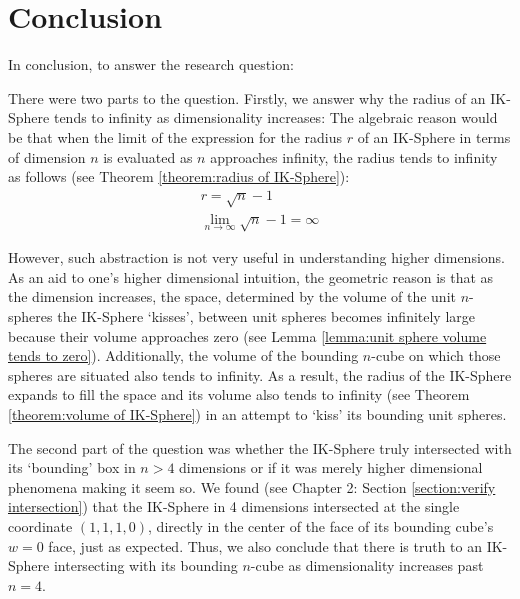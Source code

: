 \section{Conclusion}
In conclusion, to answer the research question:
\researchquestion{}

There were two parts to the question. Firstly, we answer why the radius of an IK-Sphere tends to infinity as dimensionality increases:
The algebraic reason would be that when the limit of the expression for the radius $r$ of an IK-Sphere in terms of dimension $n$ is evaluated as $n$ approaches infinity, the radius tends to infinity as follows (see Theorem \ref{theorem:radius of IK-Sphere}):
\begin{align*}
    r = \sqrt{n}-1\\
    \lim_{n \to \infty}\sqrt{n}-1 = \infty
\end{align*}

However, such abstraction is not very useful in understanding higher dimensions. As an aid to one's higher dimensional intuition, the geometric reason is that as the dimension increases, the space, determined by the volume of the unit $n$-spheres the IK-Sphere `kisses', between unit spheres becomes infinitely large because their volume approaches zero (see Lemma \ref{lemma:unit sphere volume tends to zero}). Additionally, the volume of the bounding $n$-cube on which those spheres are situated also tends to infinity. As a result, the radius of the IK-Sphere expands to fill the space and its volume also tends to infinity (see Theorem \ref{theorem:volume of IK-Sphere}) in an attempt to `kiss' its bounding unit spheres. 

The second part of the question was whether the IK-Sphere truly intersected with its `bounding' box in $n>4$ dimensions or if it was merely higher dimensional phenomena making it seem so. We found (see Chapter 2: Section \ref{section:verify intersection}) that the IK-Sphere in 4 dimensions intersected at the single coordinate $(1, 1, 1, 0)$, directly in the center of the face of its bounding cube's $w=0$ face, just as expected. Thus, we also conclude that there is truth to an IK-Sphere intersecting with its bounding $n$-cube as dimensionality increases past $n=4$.

